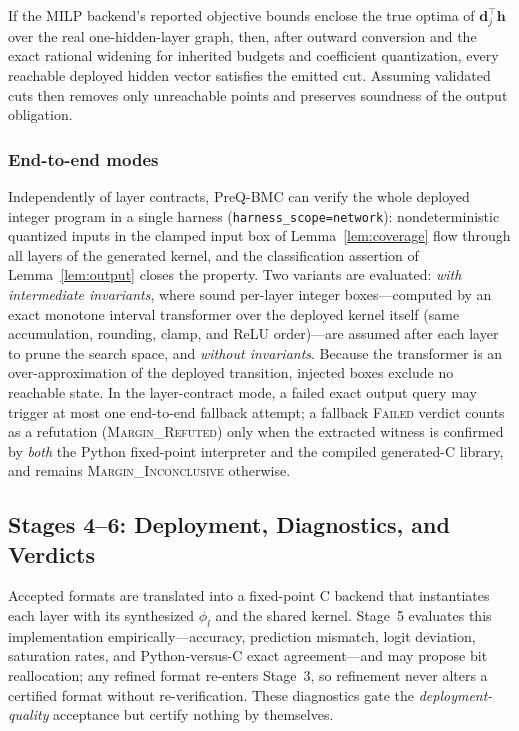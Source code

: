 \begin{lemma}
\label{lem:cuts}
If the MILP backend's reported objective bounds enclose the true optima
of $\mathbf{d}_j^{\!\top}\mathbf{h}$ over the real one-hidden-layer
graph, then, after outward conversion and the exact rational widening
for inherited budgets and coefficient quantization, every reachable
deployed hidden vector satisfies the emitted cut. Assuming validated
cuts then removes only unreachable points and preserves soundness of
the output obligation.
\end{lemma}
 
\subsubsection{End-to-end modes}
Independently of layer contracts, PreQ-BMC can verify the whole
deployed integer program in a single harness
(\texttt{harness\_scope=network}): nondeterministic quantized inputs in
the clamped input box of Lemma~\ref{lem:coverage} flow through all
layers of the generated kernel, and the classification assertion of
Lemma~\ref{lem:output} closes the property. Two variants are evaluated:
\emph{with intermediate invariants}, where sound per-layer integer
boxes---computed by an exact monotone interval transformer over the
deployed kernel itself (same accumulation, rounding, clamp, and ReLU
order)---are assumed after each layer to prune the search space, and
\emph{without invariants}. Because the transformer is an
over-approximation of the deployed transition, injected boxes exclude
no reachable state. In the layer-contract mode, a failed exact output
query may trigger at most one end-to-end fallback attempt; a fallback
\textsc{Failed} verdict counts as a refutation
(\textsc{Margin\_Refuted}) only when the extracted witness is confirmed
by \emph{both} the Python fixed-point interpreter and the compiled
generated-C library, and remains \textsc{Margin\_Inconclusive}
otherwise.
 
\subsection{Stages 4--6: Deployment, Diagnostics, and Verdicts}
\label{sec:deployment}
 
Accepted formats are translated into a fixed-point C backend that
instantiates each layer with its synthesized $\phi_l$ and the shared
kernel. Stage~5 evaluates this implementation empirically---accuracy,
prediction mismatch, logit deviation, saturation rates, and
Python-versus-C exact agreement---and may propose bit reallocation;
any refined format re-enters Stage~3, so refinement never alters a
certified format without re-verification. These diagnostics gate the
\emph{deployment-quality} acceptance but certify nothing by themselves.
 
